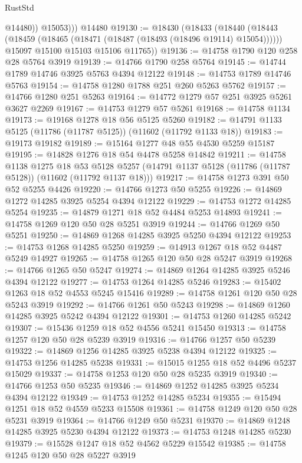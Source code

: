 \begin{lexlean}{RustStd}
\begin{coremodule}
              @14480))
          @15053)))
    @14480
@19130 := @18430
    (@18433
      (@18440
        (@18443 (@18459 (@18465 (@18471 (@18487 (@18493 (@18496 @19114) @15054))))))
        @15097
        @15100
        @15103
        @15106
        @11765))
@19136 := @14758 @1790 @120 @258 @28 @5764 @3919
@19139 := @14766 @1790 @258 @5764
@19145 := @14744 @1789 @14746 @3925 @5763 @4394 @12122
@19148 := @14753 @1789 @14746 @5763
@19154 := @14758 @1280 @1788 @251 @260 @5263 @5762
@19157 := @14766 @1280 @251 @5263
@19164 := @14772 @1279 @57 @251 @3925 @5261 @3627 @2269
@19167 := @14753 @1279 @57 @5261
@19168 := @14758 @1134
@19173 := @19168 @1278 @18 @56 @5125 @5260
@19182 := @14791 @1133 @5125 (@11786 (@11787 @5125)) (@11602 (@11792 @1133 @18))
@19183 := @19173 @19182
@19189 := @15164 @1277 @48 @55 @4530 @5259 @15187
@19195 := @14828 @1276 @18 @54 @4478 @5258 @14842
@19211 := @14758
    @1138
    @1275
    @18
    @53
    @5128
    @5257
    (@14791 @1137 @5128 (@11786 (@11787 @5128)) (@11602 (@11792 @1137 @18)))
@19217 := @14758 @1273 @391 @50 @52 @5255 @4426
@19220 := @14766 @1273 @50 @5255
@19226 := @14869 @1272 @14285 @3925 @5254 @4394 @12122
@19229 := @14753 @1272 @14285 @5254
@19235 := @14879 @1271 @18 @52 @4484 @5253 @14893
@19241 := @14758 @1269 @120 @50 @28 @5251 @3919
@19244 := @14766 @1269 @50 @5251
@19250 := @14869 @1268 @14285 @3925 @5250 @4394 @12122
@19253 := @14753 @1268 @14285 @5250
@19259 := @14913 @1267 @18 @52 @4487 @5249 @14927
@19265 := @14758 @1265 @120 @50 @28 @5247 @3919
@19268 := @14766 @1265 @50 @5247
@19274 := @14869 @1264 @14285 @3925 @5246 @4394 @12122
@19277 := @14753 @1264 @14285 @5246
@19283 := @15402 @1263 @18 @52 @4553 @5245 @15416
@19289 := @14758 @1261 @120 @50 @28 @5243 @3919
@19292 := @14766 @1261 @50 @5243
@19298 := @14869 @1260 @14285 @3925 @5242 @4394 @12122
@19301 := @14753 @1260 @14285 @5242
@19307 := @15436 @1259 @18 @52 @4556 @5241 @15450
@19313 := @14758 @1257 @120 @50 @28 @5239 @3919
@19316 := @14766 @1257 @50 @5239
@19322 := @14869 @1256 @14285 @3925 @5238 @4394 @12122
@19325 := @14753 @1256 @14285 @5238
@19331 := @15015 @1255 @18 @52 @4496 @5237 @15029
@19337 := @14758 @1253 @120 @50 @28 @5235 @3919
@19340 := @14766 @1253 @50 @5235
@19346 := @14869 @1252 @14285 @3925 @5234 @4394 @12122
@19349 := @14753 @1252 @14285 @5234
@19355 := @15494 @1251 @18 @52 @4559 @5233 @15508
@19361 := @14758 @1249 @120 @50 @28 @5231 @3919
@19364 := @14766 @1249 @50 @5231
@19370 := @14869 @1248 @14285 @3925 @5230 @4394 @12122
@19373 := @14753 @1248 @14285 @5230
@19379 := @15528 @1247 @18 @52 @4562 @5229 @15542
@19385 := @14758 @1245 @120 @50 @28 @5227 @3919

\end{coremodule}
\end{lexlean}
